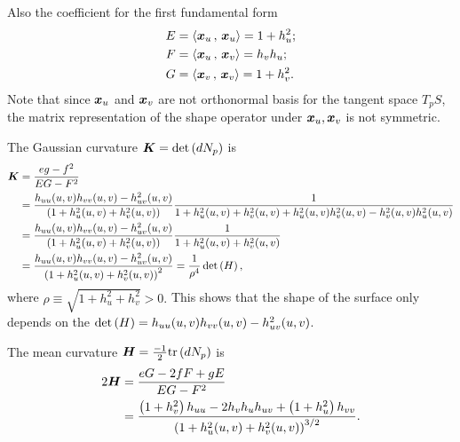 \documentclass[11pt]{article}
\begin{document}
\begin{enumerate}
\begin{solution}
Also the coefficient for the first fundamental form 
\begin{align*}
E &= \left\langle \boldsymbol{x}_{u}\,,\, \boldsymbol{x}_{u} \right\rangle= 1+ h^{2}_{u}; \\
F &= \left\langle \boldsymbol{x}_{u}\,,\, \boldsymbol{x}_{v} \right\rangle= h_{v}h_{u}; \\
G &= \left\langle \boldsymbol{x}_{v}\,,\, \boldsymbol{x}_{v} \right\rangle = 1+ h^{2}_{v}. \\
\end{align*}
Note that since $\boldsymbol{x}_{u}$ and $\boldsymbol{x}_{v}$ are not orthonormal basis for the tangent space $T_{p}S$, the matrix representation of the shape operator under $\boldsymbol{x}_{u}, \boldsymbol{x}_{v}$ is not symmetric. 

The Gaussian curvature $\boldsymbol{K} = \det\left(dN_{p}\right)$ is
\begin{align*}
\boldsymbol{K} &= \frac{eg- f^{2}}{EG - F^{2}}\\
&= \frac{h_{uu}(u,v)h_{vv}(u,v)- h_{uv}^{2}(u,v)}{\left({1+ h^{2}_{u}(u,v) + h^{2}_{v}(u,v)}\right)}\frac{1}{1+h^{2}_{u}(u,v)+h^{2}_{v}(u,v) + h^{2}_{u}(u,v)h^{2}_{v}(u,v) - h_{v}^{2}(u,v)h_{u}^{2}(u,v)}\\
&= \frac{h_{uu}(u,v)h_{vv}(u,v)- h_{uv}^{2}(u,v)}{\left({1+ h^{2}_{u}(u,v) + h^{2}_{v}(u,v)}\right)}\frac{1}{1+h^{2}_{u}(u,v)+h^{2}_{v}(u,v) }\\
&=  \frac{h_{uu}(u,v)h_{vv}(u,v)- h_{uv}^{2}(u,v)}{\left(1+ h^{2}_{u}(u,v) + h^{2}_{v}(u,v)\right)^{2}}
=\frac{1}{\rho^{4}}\det\left(H\right),
\end{align*} where $\rho \equiv \sqrt{1+ h^{2}_{u} + h^{2}_{v}}>0.$
This shows that the shape of the surface only depends on the $\det\left(H\right)= h_{uu}(u,v)h_{vv}(u,v)- h_{uv}^{2}(u,v)$.

The mean curvature $\boldsymbol{H}= \frac{-1}{2}\text{tr}\left(dN_{p}\right)$ is
\begin{align*}
2\boldsymbol{H} &= \frac{eG - 2fF + gE}{EG-F^{2}}\\
&= \frac{\left(1+ h^{2}_{v}\right)h_{uu} -  2h_{v}h_{u}h_{uv}+  \left(1+ h^{2}_{u}\right)h_{vv}}{\left({1+ h^{2}_{u}(u,v) + h^{2}_{v}(u,v)}\right)^{3/2}}.
\end{align*}


\end{solution}
\end{enumerate}
\end{document}
